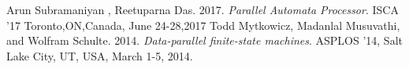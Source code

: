 \begin{thebibliography}[9]
    Arun Subramaniyan , Reetuparna Das. 2017.
    \textit{Parallel Automata Processor}. 
    ISCA ’17 Toronto,ON,Canada, June 24-28,2017
    Todd Mytkowicz, Madanlal Musuvathi, and Wolfram Schulte. 2014.
    \textit{Data-parallel
    finite-state machines}. 
    ASPLOS ’14, Salt Lake City, UT, USA, March 1-5, 2014.
    
\end{thebibliography}